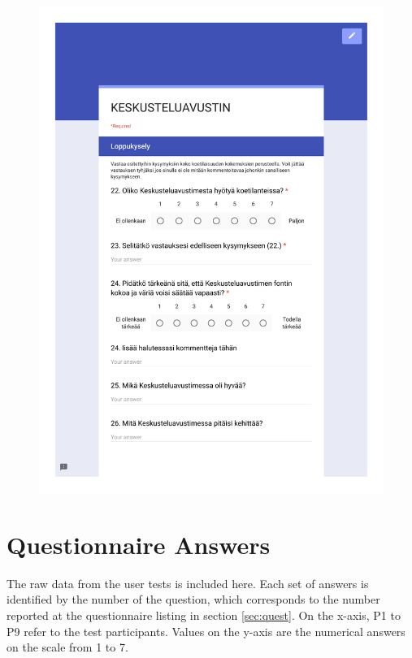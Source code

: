 \documentclass[english, 12pt, a4paper, pdftex, elec, utf8]{aaltothesis}
\begin{document}
\begin{figure}
	\centering
	\includegraphics[page=3,trim={1cm 0cm 1cm 0cm}, clip, width=\textwidth]{q4.pdf}
\end{figure}

\section{Questionnaire Answers} \label{sec:answers}

The raw data from the user tests is included here. Each set of answers is identified by the number of the question, which corresponds to the number reported at the questionnaire listing in section \ref{sec:quest}. On the x-axis, P1 to P9 refer to the test participants. Values on the y-axis are the numerical answers on the scale from 1 to 7.
\end{document}

